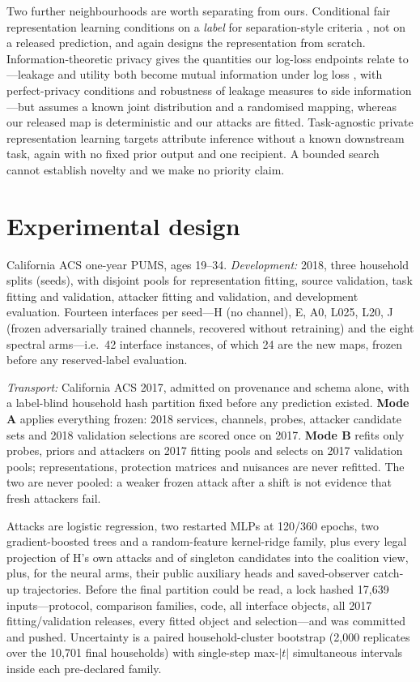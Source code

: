 \documentclass[10pt]{article}
\begin{document}
Two further neighbourhoods are worth separating from ours. Conditional fair representation learning
conditions on a \emph{label} for separation-style criteria
\citep{zhao2019conditional,hwa2024enforcing}, not on a released prediction, and again designs the
representation from scratch. Information-theoretic privacy gives the quantities our log-loss
endpoints relate to---leakage and utility both become mutual information under log loss
\citep{makhdoumi2014funnel}, with perfect-privacy conditions \citep{rassouli2021perfect} and
robustness of leakage measures to side information \citep{liao2019sideinfo}---but assumes a known
joint distribution and a randomised mapping, whereas our released map is deterministic and our
attacks are fitted. Task-agnostic private representation learning \citep{arevalo2024tappfl} targets
attribute inference without a known downstream task, again with no fixed prior output and one
recipient. A bounded search cannot establish novelty and we make no priority claim.

\section{Experimental design}
\label{sec:design}

California ACS one-year PUMS, ages 19--34. \emph{Development:} 2018, three household splits (seeds),
with disjoint pools for representation fitting, source validation, task fitting and validation,
attacker fitting and validation, and development evaluation. Fourteen interfaces per seed---H (no
channel), E, A0, L025, L20, J (frozen adversarially trained channels, recovered without retraining)
and the eight spectral arms---i.e.\ 42 interface instances, of which 24 are the new maps, frozen
before any reserved-label evaluation.

\emph{Transport:} California ACS 2017, admitted on provenance and schema alone, with a label-blind
household hash partition fixed before any prediction existed. \textbf{Mode A} applies everything
frozen: 2018 services, channels, probes, attacker candidate sets and 2018 validation selections are
scored once on 2017. \textbf{Mode B} refits only probes, priors and attackers on 2017 fitting pools
and selects on 2017 validation pools; representations, protection matrices and nuisances are never
refitted. The two are never pooled: a weaker frozen attack after a shift is not evidence that fresh
attackers fail.

Attacks are logistic regression, two restarted MLPs at 120/360 epochs, two gradient-boosted trees and
a random-feature kernel-ridge family, plus every legal projection of H's own attacks and of singleton
candidates into the coalition view, plus, for the neural arms, their public auxiliary heads and
saved-observer catch-up trajectories. Before the final partition could be read, a lock hashed
17{,}639 inputs---protocol, comparison families, code, all interface objects, all 2017
fitting/validation releases, every fitted object and selection---and was committed and pushed.
Uncertainty is a paired household-cluster bootstrap (2{,}000 replicates over the 10{,}701 final
households) with single-step max-$|t|$ simultaneous intervals inside each pre-declared family.
\end{document}
